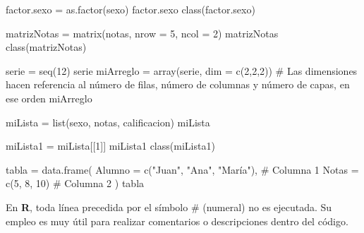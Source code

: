 \documentclass[
  spanish,
  letterpaper,
  DIV=11,
  numbers=noendperiod]{scrreprt}
\newenvironment{Shaded}{\begin{snugshade}}{\end{snugshade}}
\newcommand{\AttributeTok}[1]{\textcolor[rgb]{0.40,0.45,0.13}{#1}}
\newcommand{\CommentTok}[1]{\textcolor[rgb]{0.37,0.37,0.37}{#1}}
\newcommand{\DecValTok}[1]{\textcolor[rgb]{0.68,0.00,0.00}{#1}}
\newcommand{\FunctionTok}[1]{\textcolor[rgb]{0.28,0.35,0.67}{#1}}
\newcommand{\NormalTok}[1]{\textcolor[rgb]{0.00,0.23,0.31}{#1}}
\newcommand{\OtherTok}[1]{\textcolor[rgb]{0.00,0.23,0.31}{#1}}
\newcommand{\StringTok}[1]{\textcolor[rgb]{0.13,0.47,0.30}{#1}}
\begin{document}
\begin{Shaded}
\begin{Highlighting}[]
\NormalTok{factor.sexo }\OtherTok{=} \FunctionTok{as.factor}\NormalTok{(sexo)}
\NormalTok{factor.sexo}
\FunctionTok{class}\NormalTok{(factor.sexo)}

\NormalTok{matrizNotas }\OtherTok{=} \FunctionTok{matrix}\NormalTok{(notas, }\AttributeTok{nrow =} \DecValTok{5}\NormalTok{, }\AttributeTok{ncol =} \DecValTok{2}\NormalTok{)}
\NormalTok{matrizNotas}
\FunctionTok{class}\NormalTok{(matrizNotas)}

\NormalTok{serie }\OtherTok{=} \FunctionTok{seq}\NormalTok{(}\DecValTok{12}\NormalTok{)}
\NormalTok{serie}
\NormalTok{miArreglo }\OtherTok{=} \FunctionTok{array}\NormalTok{(serie, }\AttributeTok{dim =} \FunctionTok{c}\NormalTok{(}\DecValTok{2}\NormalTok{,}\DecValTok{2}\NormalTok{,}\DecValTok{2}\NormalTok{)) }\CommentTok{\# Las dimensiones hacen referencia al número de filas, número de columnas y número de capas, en ese orden}
\NormalTok{miArreglo}

\NormalTok{miLista }\OtherTok{=} \FunctionTok{list}\NormalTok{(sexo, notas, calificacion)}
\NormalTok{miLista}

\NormalTok{miLista1 }\OtherTok{=}\NormalTok{ miLista[[}\DecValTok{1}\NormalTok{]]}
\NormalTok{miLista1}
\FunctionTok{class}\NormalTok{(miLista1)}

\NormalTok{tabla }\OtherTok{=} \FunctionTok{data.frame}\NormalTok{(}
  \AttributeTok{Alumno =} \FunctionTok{c}\NormalTok{(}\StringTok{"Juan"}\NormalTok{, }\StringTok{"Ana"}\NormalTok{, }\StringTok{"María"}\NormalTok{), }\CommentTok{\# Columna 1}
  \AttributeTok{Notas =} \FunctionTok{c}\NormalTok{(}\DecValTok{5}\NormalTok{, }\DecValTok{8}\NormalTok{, }\DecValTok{10}\NormalTok{) }\CommentTok{\# Columna 2}
\NormalTok{)}
\NormalTok{tabla}
\end{Highlighting}
\end{Shaded}

\begin{tcolorbox}[enhanced jigsaw, arc=.35mm, bottomrule=.15mm, bottomtitle=1mm, breakable, colback=white, colbacktitle=quarto-callout-tip-color!10!white, colframe=quarto-callout-tip-color-frame, coltitle=black, left=2mm, leftrule=.75mm, opacityback=0, opacitybacktitle=0.6, rightrule=.15mm, title=\textcolor{quarto-callout-tip-color}{\faLightbulb}\hspace{0.5em}{Comentarios (\#)}, titlerule=0mm, toprule=.15mm, toptitle=1mm]

En \textbf{R}, toda línea precedida por el símbolo \# (numeral) no es
ejecutada. Su empleo es muy útil para realizar comentarios o
descripciones dentro del código.

\end{tcolorbox}
\end{document}
